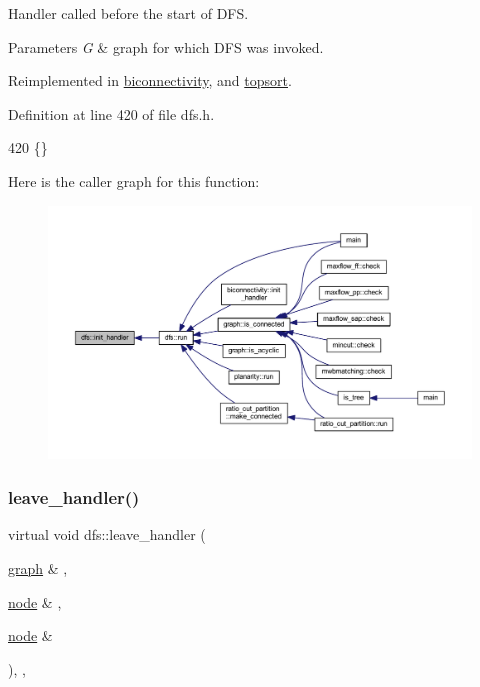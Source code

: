 Handler called before the start of D\+FS. 


\begin{DoxyParams}{Parameters}
{\em G} & graph for which D\+FS was invoked. \\
\hline
\end{DoxyParams}


Reimplemented in \mbox{\hyperlink{classbiconnectivity_a64adab869e0080e3a1f8479e70010317}{biconnectivity}}, and \mbox{\hyperlink{classtopsort_a21aaf28fc280094ed43288e58d8e3ae1}{topsort}}.



Definition at line 420 of file dfs.\+h.


\begin{DoxyCode}
420 \{\}
\end{DoxyCode}
Here is the caller graph for this function\+:
\nopagebreak
\begin{figure}[H]
\begin{center}
\leavevmode
\includegraphics[width=350pt]{classdfs_aae46a50d0c73c63bf72e483668fd22a2_icgraph}
\end{center}
\end{figure}
\mbox{\label{classdfs_abfe33292cd567f22596ba0c313481582}} 
\subsubsection{\texorpdfstring{leave\+\_\+handler()}{leave\_handler()}}
{\footnotesize\ttfamily virtual void dfs\+::leave\+\_\+handler (\begin{DoxyParamCaption}\item[{\mbox{\hyperlink{classgraph}{graph}} \&}]{,  }\item[{\mbox{\hyperlink{classnode}{node}} \&}]{,  }\item[{\mbox{\hyperlink{classnode}{node}} \&}]{ }\end{DoxyParamCaption})\hspace{0.3cm}{\ttfamily [inline]}, {\ttfamily [virtual]}, {\ttfamily [inherited]}}



